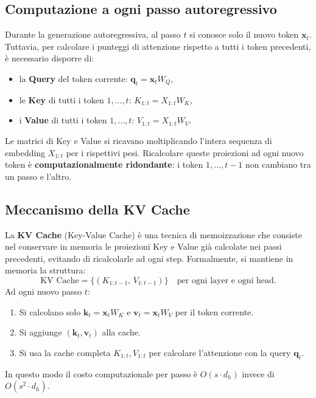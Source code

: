 \subsection{Computazione a ogni passo autoregressivo}
\label{subsec:autoregressive-step}

Durante la generazione autoregressiva, al passo $t$ si conosce solo il nuovo
token $\mathbf{x}_t$. Tuttavia, per calcolare i punteggi di attenzione
rispetto a tutti i token precedenti, è necessario disporre di:
\begin{itemize}
  \item la \textbf{Query} del token corrente: $\mathbf{q}_t = \mathbf{x}_t W_Q$,
  \item le \textbf{Key} di tutti i token $1,\ldots,t$: $K_{1:t} = X_{1:t} W_K$,
  \item i \textbf{Value} di tutti i token $1,\ldots,t$: $V_{1:t} = X_{1:t} W_V$.
\end{itemize}
Le matrici di Key e Value si ricavano moltiplicando l'intera sequenza di
embedding $X_{1:t}$ per i rispettivi pesi. Ricalcolare queste proiezioni
ad ogni nuovo token è \textbf{computazionalmente ridondante}: i token
$1, \ldots, t{-}1$ non cambiano tra un passo e l'altro.

\subsection{Meccanismo della KV Cache}
\label{subsec:kv-cache-mechanism}

La \textbf{KV Cache} (Key-Value Cache) è una tecnica di memoizzazione che
consiste nel conservare in memoria le proiezioni Key e Value già calcolate
nei passi precedenti, evitando di ricalcolarle ad ogni step. Formalmente,
si mantiene in memoria la struttura:
\begin{equation}
  \text{KV Cache} = \bigl\{(K_{1:t-1},\, V_{1:t-1})\bigr\}
  \quad \text{per ogni layer e ogni head.}
\end{equation}
Ad ogni nuovo passo $t$:
\begin{enumerate}
  \item Si calcolano solo $\mathbf{k}_t = \mathbf{x}_t W_K$ e
        $\mathbf{v}_t = \mathbf{x}_t W_V$ per il token corrente.
  \item Si aggiunge $(\mathbf{k}_t, \mathbf{v}_t)$ alla cache.
  \item Si usa la cache completa $K_{1:t}, V_{1:t}$ per calcolare
        l'attenzione con la query $\mathbf{q}_t$.
\end{enumerate}
In questo modo il costo computazionale per passo è $O(s \cdot d_h)$ invece
di $O(s^2 \cdot d_h)$.

